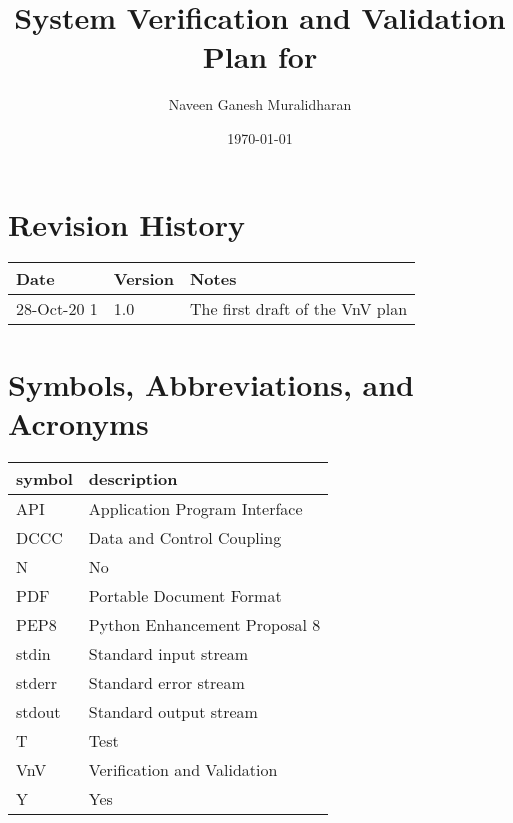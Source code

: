 \documentclass[12pt, titlepage]{article}
\begin{document}
\title{System Verification and Validation Plan for \progname{}} 
\author{Naveen Ganesh Muralidharan}
\date{\today}
	
\maketitle


\section{Revision History}

\begin{tabularx}{\textwidth}{p{3cm}p{2cm}X}
\toprule {\bf Date} & {\bf Version} & {\bf Notes}\\
\midrule
28-Oct-20 1 & 1.0 & The first draft of the VnV plan\\
\bottomrule
\end{tabularx}

\newpage

\tableofcontents

\listoftables

\newpage

\section{Symbols, Abbreviations, and Acronyms}

\renewcommand{\arraystretch}{1.2}
\begin{tabular}{l l} 
  \toprule		
  \textbf{symbol} & \textbf{description}\\
  \midrule 
  API & Application Program Interface\\
  DCCC & Data and Control Coupling\\
  N & No\\
  PDF & Portable Document Format \\
  PEP8 & Python Enhancement Proposal 8\\
  stdin & Standard input stream\\
  stderr & Standard error stream\\
  stdout & Standard output stream\\
  T & Test\\
  VnV & Verification and Validation\\
  Y & Yes\\
  \bottomrule
\end{tabular}\\
\end{document}
